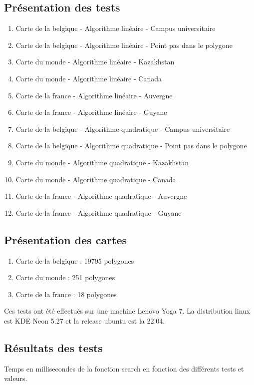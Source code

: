 \documentclass[utf8]{article}
\begin{document}
\begin{large}
  \subsection{Présentation des tests}
  \begin{enumerate}
    \item Carte de la belgique - Algorithme linéaire - Campus universitaire
    \item Carte de la belgique - Algorithme linéaire - Point pas dans le polygone
    \item Carte du monde - Algorithme linéaire - Kazakhstan
    \item Carte du monde - Algorithme linéaire - Canada
    \item Carte de la france - Algorithme linéaire - Auvergne
    \item Carte de la france - Algorithme linéaire - Guyane
    \item Carte de la belgique - Algorithme quadratique - Campus universitaire
    \item Carte de la belgique - Algorithme quadratique - Point pas dans le polygone
    \item Carte du monde - Algorithme quadratique - Kazakhstan
    \item Carte du monde - Algorithme quadratique - Canada
    \item Carte de la france - Algorithme quadratique - Auvergne
    \item Carte de la france - Algorithme quadratique - Guyane
  \end{enumerate}

  \subsection{Présentation des cartes}
  \begin{enumerate}
    \item Carte de la belgique : 19795 polygones
    \item Carte du monde : 251 polygones
    \item Carte de la france : 18 polygones
  \end{enumerate}

  \indent
  \par
  Ces tests ont été effectués sur une machine Lenovo Yoga 7. La distribution
  linux est KDE Neon 5.27 et la release ubuntu est la 22.04.
  \indent

  \subsection{Résultats des tests}
  \indent
  \par
  Temps en millisecondes de la fonction search en fonction des différents tests et valeurs.


\end{large}
\end{document}
